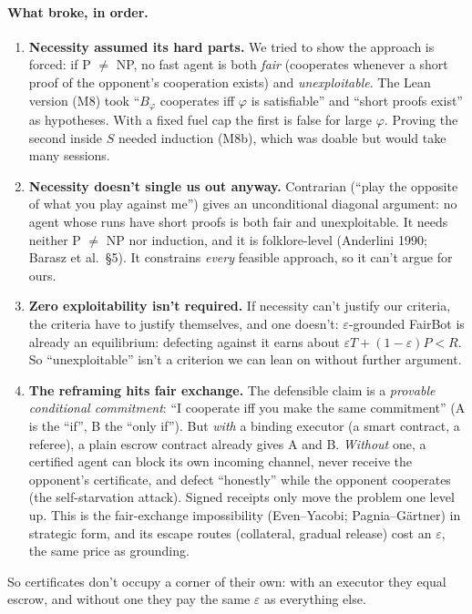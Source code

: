 \documentclass[11pt]{article}
\begin{document}
\paragraph{What broke, in order.}
\begin{enumerate}
\item \textbf{Necessity assumed its hard parts.} We tried to show the approach is forced: if P $\neq$ NP, no fast agent is both \emph{fair} (cooperates whenever a short proof of the opponent's cooperation exists) and \emph{unexploitable}. The Lean version (M8) took ``$B_\varphi$ cooperates iff $\varphi$ is satisfiable'' and ``short proofs exist'' as hypotheses. With a fixed fuel cap the first is false for large $\varphi$. Proving the second inside $S$ needed induction (M8b), which was doable but would take many sessions.
\item \textbf{Necessity doesn't single us out anyway.} Contrarian (``play the opposite of what you play against me'') gives an unconditional diagonal argument: no agent whose runs have short proofs is both fair and unexploitable. It needs neither P $\neq$ NP nor induction, and it is folklore-level (Anderlini 1990; Barasz et al.\ \S5). It constrains \emph{every} feasible approach, so it can't argue for ours.
\item \textbf{Zero exploitability isn't required.} If necessity can't justify our criteria, the criteria have to justify themselves, and one doesn't: $\varepsilon$-grounded FairBot is already an equilibrium: defecting against it earns about $\varepsilon T + (1-\varepsilon)P < R$. So ``unexploitable'' isn't a criterion we can lean on without further argument.
\item \textbf{The reframing hits fair exchange.} The defensible claim is a \emph{provable conditional commitment}: ``I cooperate iff you make the same commitment'' (A is the ``if'', B the ``only if''). But \emph{with} a binding executor (a smart contract, a referee), a plain escrow contract already gives A and B. \emph{Without} one, a certified agent can block its own incoming channel, never receive the opponent's certificate, and defect ``honestly'' while the opponent cooperates (the self-starvation attack). Signed receipts only move the problem one level up. This is the fair-exchange impossibility (Even--Yacobi; Pagnia--Gärtner) in strategic form, and its escape routes (collateral, gradual release) cost an $\varepsilon$, the same price as grounding.
\end{enumerate}
So certificates don't occupy a corner of their own: with an executor they equal escrow, and without one they pay the same $\varepsilon$ as everything else.
\end{document}
